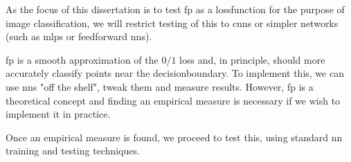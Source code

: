 As the focus of this dissertation is to test \gls{fp} as a \gls{lossfunction} for the purpose of image classification, we will restrict testing of this to \gls{cnn}s or simpler networks (such as  \gls{mlp}s or \gls{feedforward} \gls{nn}s).

 \gls{fp} is a smooth approximation of the $0/1$ loss and, in principle, should more accurately classify points near the \gls{decisionboundary}. To implement this, we can use  \gls{nn}s "off the shelf", tweak them and measure results. However,  \gls{fp} is a theoretical concept and finding an empirical measure is necessary if we wish to implement it in practice. 

Once an empirical measure is found, we proceed to test this, using standard \gls{nn} training and testing techniques.

